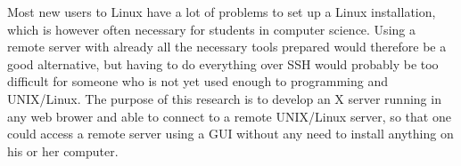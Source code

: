 Most new users to Linux have a lot of problems to set up a Linux installation, which is however often necessary for students in computer science. Using a remote server with already all the necessary tools prepared would therefore be a good alternative, but having to do everything over SSH would probably be too difficult for someone who is not yet used enough to programming and UNIX/Linux. The purpose of this research is to develop an X server running in any web brower and able to connect to a remote UNIX/Linux server, so that one could access a remote server using a GUI without any need to install anything on his or her computer. 